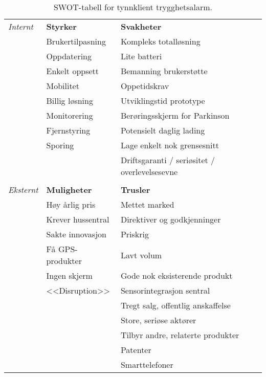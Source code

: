 \begin{table}
  \centering
  \begin{tabular}{lll}
    \textit{Internt}
             & \textbf{Styrker}       & \textbf{Svakheter}            \\
             & Brukertilpasning       & Kompleks totalløsning         \\
             & Oppdatering            & Lite batteri                  \\
             & Enkelt oppsett         & Bemanning brukerstøtte        \\
             & Mobilitet              & Oppetidskrav                  \\
             & Billig løsning         & Utviklingstid prototype       \\
             & Monitorering           & Berøringsskjerm for Parkinson \\
             & Fjernstyring           & Potensielt daglig lading      \\
             & Sporing                & Lage enkelt nok grensesnitt   \\
             &                        & Driftsgaranti / seriøsitet /
    overlevelsesevne \\
    \\
    \textit{Eksternt}
             & \textbf{Muligheter}    & \textbf{Trusler}              \\
             & Høy årlig pris         & Mettet marked                 \\
             & Krever hussentral      & Direktiver og godkjenninger   \\
             & Sakte innovasjon       & Priskrig                      \\
             & Få GPS-produkter       & Lavt volum                    \\
             & Ingen skjerm           & Gode nok eksisterende produkt \\
             & <<Disruption>>         & Sensorintegrasjon sentral     \\
             &                        & Tregt salg, offentlig anskaffelse \\
             &                        & Store, seriøse aktører \\
             &                        & Tilbyr andre, relaterte produkter \\
             &                        & Patenter \\
             &                        & Smarttelefoner \\
  \end{tabular}
  \caption{SWOT-tabell for tynnklient trygghetsalarm.}
  \label{table.swot}
\end{table}


